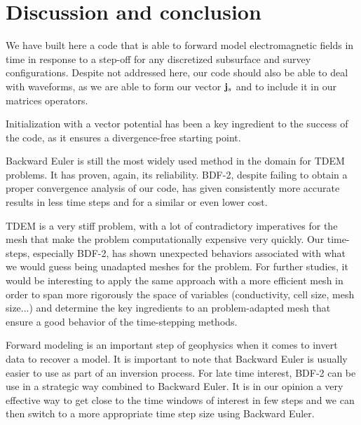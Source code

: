 \documentclass[twoside]{article}
\begin{document}
\newpage

\section{Discussion and conclusion}
We have built here a code that is able to forward model electromagnetic fields in time in response to a step-off for any discretized subsurface and survey configurations. Despite not addressed here, our code should also be able to deal with waveforms, as we are able to form our vector ${\bf j}_s$ and to include it in our matrices operators.

Initialization with a vector potential has been a key ingredient to the success of the code, as it ensures a divergence-free starting point.

Backward Euler is still the most widely used method in the domain for TDEM problems. It has proven, again, its reliability. BDF-2, despite failing to obtain a proper convergence analysis of our code, has given consistently more accurate results in less time steps and for a similar or even lower cost.

TDEM is a very stiff problem, with a lot of contradictory imperatives for the mesh that make the problem computationally expensive very quickly. Our time-steps, especially BDF-2, has shown unexpected behaviors associated with what we would guess being unadapted meshes for the problem. For further studies, it would be interesting to apply the same approach with a more efficient mesh in order to span more rigorously the space of variables (conductivity, cell size, mesh size...) and determine the key ingredients to an problem-adapted mesh that ensure a good behavior of the time-stepping methods.

Forward modeling is an important step of geophysics when it comes to invert data to recover a model. It is important to note that Backward Euler is usually easier to use as part of an inversion process. For late time interest, BDF-2 can be use in a strategic way combined to Backward Euler. It is in our opinion a very effective way to get close to the time windows of interest in few steps and we can then switch to a more appropriate time step size using Backward Euler.

\newpage
\end{document}
